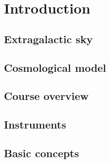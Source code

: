 \chapter{Introduction}

\section{Extragalactic sky}
\section{Cosmological model}
\section{Course overview}
\section{Instruments}
\section{Basic concepts}